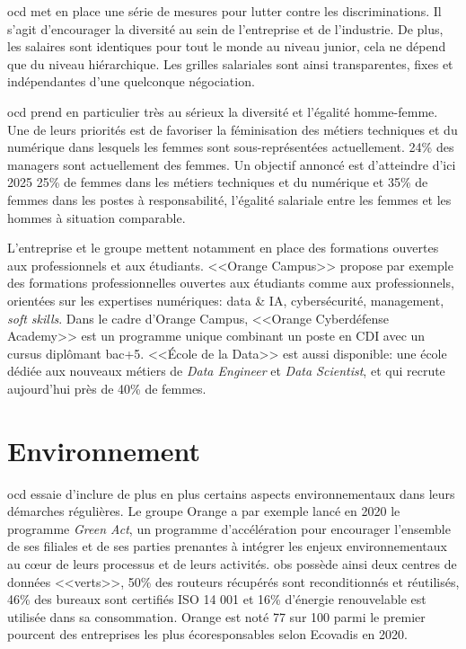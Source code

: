 \documentclass[12pt, oneside, a4paper, titlepage]{report}
\begin{document}
\acrlong{ocd} met en place une série de mesures pour lutter contre les
discriminations. Il s'agit d'encourager la diversité au sein de l'entreprise et
de l'industrie.  De plus, les salaires sont identiques pour tout le monde au
niveau junior, cela ne dépend que du niveau hiérarchique. Les grilles salariales
sont ainsi transparentes, fixes et indépendantes d'une quelconque négociation.

\gls{ocd} prend en particulier très au sérieux la diversité et l'égalité
homme-femme. Une de leurs priorités est de favoriser la féminisation des métiers
techniques et du numérique dans lesquels les femmes sont sous-représentées
actuellement. 24\% des managers sont actuellement des femmes. Un objectif
annoncé est d'atteindre d'ici 2025 25\% de femmes dans les métiers techniques et
du numérique et 35\% de femmes dans les postes à responsabilité, l'égalité
salariale entre les femmes et les hommes à situation comparable.

L'entreprise et le groupe mettent notamment en place des formations ouvertes aux
professionnels et aux étudiants. <<Orange Campus>> propose par exemple des
formations professionnelles ouvertes aux étudiants comme aux professionnels,
orientées sur les expertises numériques: data \& IA, cybersécurité, management,
\textit{soft skills}. Dans le cadre d'Orange Campus, <<Orange Cyberdéfense
Academy>> est un programme unique combinant un poste en CDI avec un cursus
diplômant bac+5.  <<École de la Data>> est aussi disponible: une école dédiée
aux nouveaux métiers de \textit{Data Engineer} et \textit{Data Scientist}, et
qui recrute aujourd'hui près de 40\% de femmes.

\section{Environnement}%
\label{sec:rse::env}

\gls{ocd} essaie d'inclure de plus en plus certains aspects environnementaux
dans leurs démarches régulières. Le groupe Orange a par exemple lancé en 2020 le
programme \textit{Green Act}, un programme d'accélération pour encourager
l'ensemble de ses filiales et de ses parties prenantes à intégrer les enjeux
environnementaux au cœur de leurs processus et de leurs activités.
\acrlong{obs} possède ainsi deux centres de données <<verts>>, 50\% des routeurs
récupérés sont reconditionnés et réutilisés, 46\% des bureaux sont certifiés ISO
14 001 et 16\% d'énergie renouvelable est utilisée dans sa consommation. Orange
est noté 77 sur 100 parmi le premier pourcent des entreprises les plus
écoresponsables selon Ecovadis en 2020.
\end{document}
